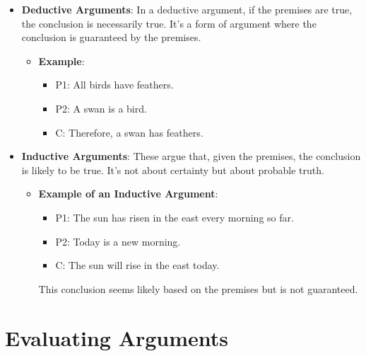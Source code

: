 \documentclass{article}
\begin{document}
\begin{itemize}
    \item \textbf{Deductive Arguments}: In a deductive argument, if the premises are true, the conclusion is necessarily true. It's a form of argument where the conclusion is guaranteed by the premises.
          \begin{itemize}
              \item \textbf{Example}:
                    \begin{itemize}
                        \item P1: All birds have feathers.
                        \item P2: A swan is a bird.
                        \item C: Therefore, a swan has feathers.
                    \end{itemize}
          \end{itemize}
    \item \textbf{Inductive Arguments}: These argue that, given the premises, the conclusion is likely to be true. It's not about certainty but about probable truth.
          \begin{itemize}
              \item \textbf{Example of an Inductive Argument}:
                    \begin{itemize}
                        \item P1: The sun has risen in the east every morning so far.
                        \item P2: Today is a new morning.
                        \item C: The sun will rise in the east today.
                    \end{itemize}
                    This conclusion seems likely based on the premises but is not guaranteed.
          \end{itemize}
\end{itemize}

\section{Evaluating Arguments}
\end{document}
